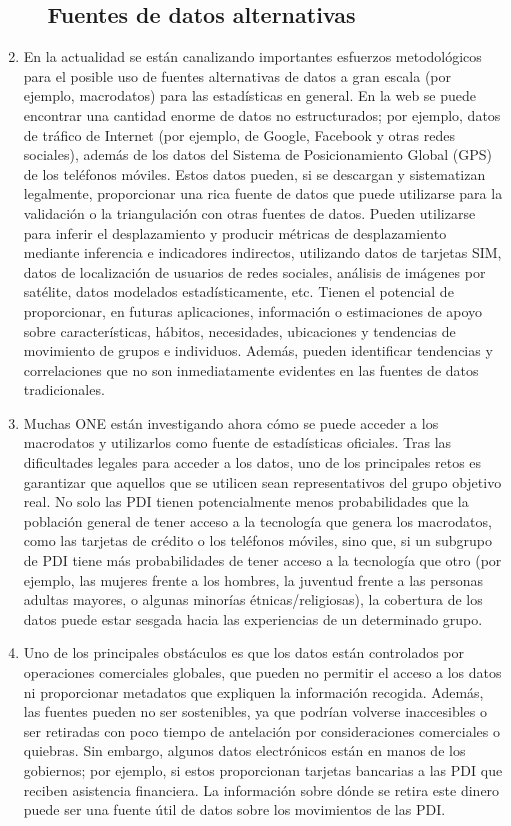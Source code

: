 \documentclass[
]{book}
\begin{document}
\begin{enumerate}
\begin{enumerate}
{    \subsection{Fuentes de datos alternativas}\label{fuentes-de-datos-alternativas}}
  \end{enumerate}
\item
  En la actualidad se están canalizando importantes esfuerzos metodológicos para el posible uso de fuentes alternativas de datos a gran escala (por ejemplo, macrodatos) para las estadísticas en general. En la web se puede encontrar una cantidad enorme de datos no estructurados; por ejemplo, datos de tráfico de Internet (por ejemplo, de Google, Facebook y otras redes sociales), además de los datos del Sistema de Posicionamiento Global (GPS) de los teléfonos móviles. Estos datos pueden, si se descargan y sistematizan legalmente, proporcionar una rica fuente de datos que puede utilizarse para la validación o la triangulación con otras fuentes de datos. Pueden utilizarse para inferir el desplazamiento y producir métricas de desplazamiento mediante inferencia e indicadores indirectos, utilizando datos de tarjetas SIM, datos de localización de usuarios de redes sociales, análisis de imágenes por satélite, datos modelados estadísticamente, etc. Tienen el potencial de proporcionar, en futuras aplicaciones, información o estimaciones de apoyo sobre características, hábitos, necesidades, ubicaciones y tendencias de movimiento de grupos e individuos. Además, pueden identificar tendencias y correlaciones que no son inmediatamente evidentes en las fuentes de datos tradicionales.
\item
  Muchas ONE están investigando ahora cómo se puede acceder a los macrodatos y utilizarlos como fuente de estadísticas oficiales. Tras las dificultades legales para acceder a los datos, uno de los principales retos es garantizar que aquellos que se utilicen sean representativos del grupo objetivo real. No solo las PDI tienen potencialmente menos probabilidades que la población general de tener acceso a la tecnología que genera los macrodatos, como las tarjetas de crédito o los teléfonos móviles, sino que, si un subgrupo de PDI tiene más probabilidades de tener acceso a la tecnología que otro (por ejemplo, las mujeres frente a los hombres, la juventud frente a las personas adultas mayores, o algunas minorías étnicas/religiosas), la cobertura de los datos puede estar sesgada hacia las experiencias de un determinado grupo.
\item
  Uno de los principales obstáculos es que los datos están controlados por operaciones comerciales globales, que pueden no permitir el acceso a los datos ni proporcionar metadatos que expliquen la información recogida. Además, las fuentes pueden no ser sostenibles, ya que podrían volverse inaccesibles o ser retiradas con poco tiempo de antelación por consideraciones comerciales o quiebras. Sin embargo, algunos datos electrónicos están en manos de los gobiernos; por ejemplo, si estos proporcionan tarjetas bancarias a las PDI que reciben asistencia financiera. La información sobre dónde se retira este dinero puede ser una fuente útil de datos sobre los movimientos de las PDI.

\end{enumerate}
\end{document}

